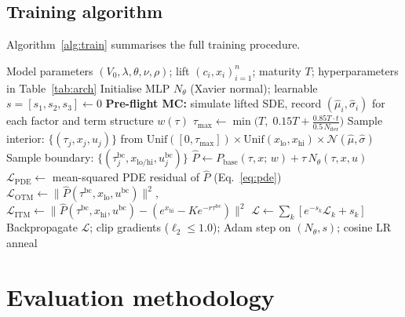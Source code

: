 \documentclass[review,12pt]{elsarticle}
\begin{document}
\subsection{Training algorithm}
Algorithm~\ref{alg:train} summarises the full training procedure.

\begin{algorithm}[t]
\caption{PINN training for the lifted rough-Heston PDE}
\label{alg:train}
\begin{algorithmic}[1]
\Require Model parameters $(V_0,\lambda,\theta,\nu,\rho)$; lift $(c_i,x_i)_{i=1}^n$;
         maturity $T$; hyperparameters in Table~\ref{tab:arch}
\State Initialise MLP $N_\theta$ (Xavier normal); learnable $s = [s_1,s_2,s_3] \leftarrow 0$
\State \textbf{Pre-flight MC:} simulate lifted SDE, record $(\hat\mu_i, \hat\sigma_i)$
       for each factor and term structure $w(\tau)$ 
  \State $\tau_{\mathrm{max}} \leftarrow \min\!\bigl(T,\; 0.15T + \tfrac{0.85T \cdot t}{0.5\,N_{\mathrm{iter}}}\bigr)$
  \State Sample interior: $\{(\tau_j, x_j, u_j)\}$ from
         $\mathrm{Unif}([0,\tau_{\mathrm{max}}])\times\mathrm{Unif}(x_{\mathrm{lo}},x_{\mathrm{hi}})
         \times\mathcal{N}(\hat\mu,\hat\sigma)$
  \State Sample boundary: $\{(\tau^{\mathrm{bc}}_j, x_{\mathrm{lo/hi}}, u^{\mathrm{bc}}_j)\}$
  \State $\hat P \leftarrow P_{\mathrm{base}}(\tau,x;\,w) + \tau\,N_\theta(\tau,x,u)$
  \State $\mathcal{L}_{\mathrm{PDE}} \leftarrow$ mean-squared PDE residual of $\hat P$
         (Eq.~\eqref{eq:pde})
  \State $\mathcal{L}_{\mathrm{OTM}} \leftarrow \|\hat P(\tau^{\mathrm{bc}},x_{\mathrm{lo}},u^{\mathrm{bc}})\|^2$,\quad
         $\mathcal{L}_{\mathrm{ITM}} \leftarrow \|\hat P(\tau^{\mathrm{bc}},x_{\mathrm{hi}},u^{\mathrm{bc}}) - (e^{x_{\mathrm{hi}}} - Ke^{-r\tau^{\mathrm{bc}}})\|^2$
  \State $\mathcal{L} \leftarrow \sum_k [e^{-s_k}\mathcal{L}_k + s_k]$
  \State Backpropagate $\mathcal{L}$; clip gradients ($\ell_2 \leq 1.0$); Adam step
         on $(N_\theta, s)$; cosine LR anneal
\EndFor
\end{algorithmic}
\end{algorithm}

\section{Evaluation methodology}
\label{sec:eval}
\end{document}
